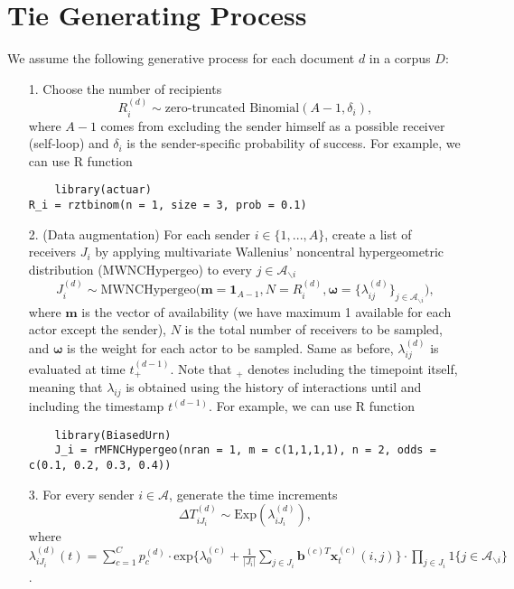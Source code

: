 \documentclass[a4paper]{article}
\begin{document}
\section{Tie Generating Process}\label{subsec: Tie Generating Process}
We assume the following generative process for each document $d$ in a corpus $D$:
\begin{itemize}
	\item[1.] Choose the number of recipients
	\begin{equation}
	R_i^{(d)} \sim \mbox{zero-truncated Binomial}(A-1, \delta_i),
	\end{equation}
	where $A-1$ comes from excluding the sender himself as a possible receiver (self-loop) and $\delta_i$ is the sender-specific probability of success. For example, we can use R function
	\begin{verbatim}
	library(actuar)
R_i = rztbinom(n = 1, size = 3, prob = 0.1)
	\end{verbatim}
	\item[2.] (Data augmentation) For each sender $i \in \{1,...,A\}$, create a list of receivers $J_i$ by applying multivariate Wallenius' noncentral hypergeometric distribution (MWNCHypergeo) to every $j \in \mathcal{A}_{\backslash i}$
	\begin{equation} 
	J^{(d)}_i\sim \mbox{MWNCHypergeo}\Big(\boldsymbol{m} =\mathbf{1}_{A-1}, N = R_i^{(d)}, \boldsymbol{\omega} =\{\lambda_{ij}^{(d)}\}_{j \in \mathcal{A}_{\backslash i}} \Big),
	\end{equation}
	where $\mathbf{m}$ is the vector of availability (we have maximum 1 available for each actor except the sender), $N$ is the total number of receivers to be sampled, and $\boldsymbol{\omega}$ is the weight for each actor to be sampled. Same as before, $\lambda^{(d)}_{ij}$ is evaluated at time $t_+^{(d-1)}$. Note that $_+$ denotes including the timepoint itself, meaning that $\lambda_{ij}$ is obtained using the history of interactions until and including the timestamp $t^{(d-1)}$. For example, we can use R function
	\begin{verbatim}
	library(BiasedUrn)
	J_i = rMFNCHypergeo(nran = 1, m = c(1,1,1,1), n = 2, odds = c(0.1, 0.2, 0.3, 0.4))
	\end{verbatim}
	\item[3.] For every sender $i \in \mathcal{A}$, generate the time increments \begin{equation}
\Delta T^{(d)}_{i{J_i}} \sim \mbox{Exp}(\lambda_{i{J_i}}^{(d)}),
	\end{equation}
where $\lambda^{(d)}_{iJ_i}(t)= \sum\limits_{c=1}^{C} p^{(d)}_c\cdot\mbox{exp}\Big\{\lambda^{(c)}_0+\frac{1}{|J_i|}\sum\limits_{j \in J_i} \boldsymbol{b}^{(c)T}\boldsymbol{x}^{(c)}_t(i, j)\Big\}\cdot \prod\limits_{j \in J_i}1\{j \in \mathcal{A}_{\backslash i}\}$.

\end{itemize}
\end{document}
